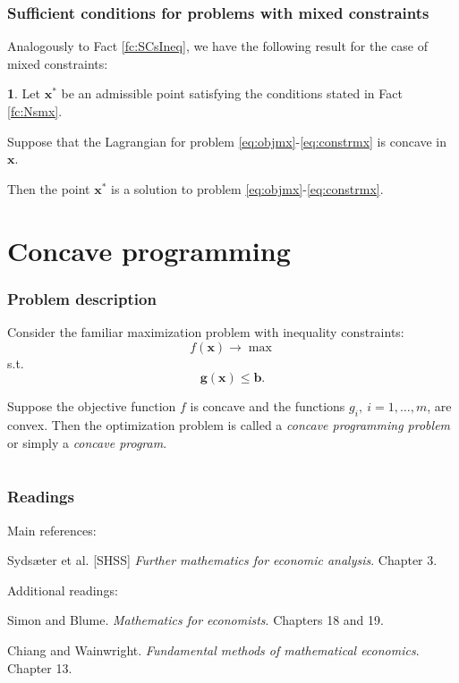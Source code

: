 \documentclass[10pt]{beamer}
\theoremstyle{definition}
\newtheorem{Fact}{\translate{Fact}}
\begin{document}
\begin{frame}[fragile]
\frametitle{Sufficient conditions for problems with mixed constraints}
Analogously to Fact \ref{fc:SCsIneq}, we have the following result for the case of mixed constraints:

\begin{Fact}
Let $ \mathbf{x^*} $ be an admissible point satisfying the conditions stated in Fact \ref{fc:Nsmx}.

Suppose that the Lagrangian for problem \eqref{eq:objmx}-\eqref{eq:constrmx} is concave in $ \mathbf{x} $.\bigskip

Then the point $ \mathbf{x^*} $ is a solution to problem \eqref{eq:objmx}-\eqref{eq:constrmx}.
\label{fc:Scsmx}
\end{Fact}
\end{frame}

\section{Concave programming}\label{sec:concave}

\begin{frame}[fragile]
\frametitle{Problem description}
Consider the familiar maximization problem with inequality constraints:
\[ f(\mathbf{x}) \rightarrow \max \]
s.t. \[ \mathbf{g}(\mathbf{x})\leq \mathbf{b}. \]

Suppose the objective function $ f $ is concave and the functions $ g_i, ~i=1,\ldots,m $, are convex. Then the optimization problem is called a \emph{concave programming problem} or simply a \emph{concave program}.

\end{frame}

\section*{}
\begin{frame}[fragile]
\frametitle{Readings}
Main references:

Syds\ae{}ter et al. [SHSS] \emph{Further mathematics for economic analysis}. Chapter 3.\bigskip

Additional readings:

Simon and Blume. \emph{Mathematics for economists}. Chapters 18 and 19.

Chiang and Wainwright. \emph{Fundamental methods of mathematical economics}. Chapter 13.
\end{frame}
\end{document}
